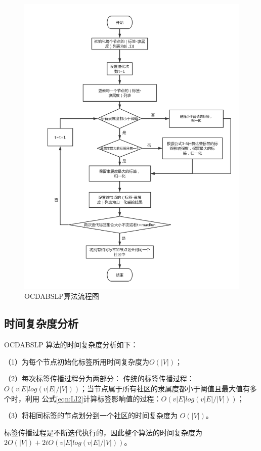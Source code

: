 \begin{figure}
  \centering
  \includegraphics[width=1\textwidth]{figures/fig4-1}
  \caption{OCDABSLP算法流程图}\label{fig:fig4-1}
\end{figure}

\subsection{时间复杂度分析}
OCDABSLP 算法的时间复杂度分析如下： 

（1）为每个节点初始化标签所用时间复杂度为$ O(|V|)$； 

（2）每次标签传播过程分为两部分： 传统的标签传播过程：$O(v|E|log(v|E|/|V|))$；当节点属于所有社区的隶属度都小于阈值且最大值有多个时，利用
公式\ref{eqn:LI2}计算标签影响值的过程：$O(v|E|log(v|E|/|V|))$； 

（3）将相同标签的节点划分到一个社区的时间复杂度为 $O(|V|)$。 

标签传播过程是不断迭代执行的，因此整个算法的时间复杂度为
$2O(|V|)+2tO(v|E|log(v|E|/|V|))$。

